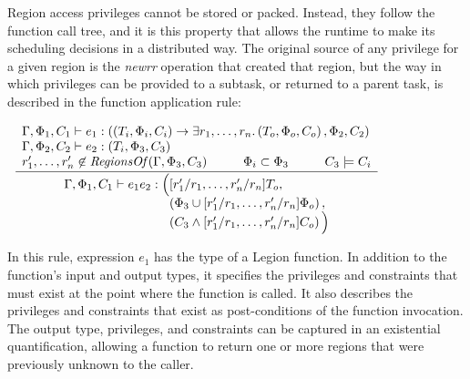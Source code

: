 Region access privileges cannot be stored or packed.  Instead, they follow the
function call tree, and it is this property that allows the runtime to make
its scheduling decisions in a distributed way.  The original source of any
privilege for a given region is the \emph{newrr} operation that created that
region, but the way in which privileges can be provided to a subtask, or
returned to a parent task, is described in the function application rule:

\begin{center}
\begin{math}
\begin{array}{c}
\infrule
{
\begin{array}{lc}
  \Gamma, \Phi_1, C_1 \vdash e_1 : \left(\left(T_i, \Phi_i, C_i\right) \rightarrow \exists r_1, \ldots, r_n . \left(T_o, \Phi_o, C_o\right), \Phi_2, C_2\right) \\
  \Gamma, \Phi_2, C_2 \vdash e_2 : \left(T_i, \Phi_3, C_3\right) \\
  r'_1, \ldots, r'_n \not\in \mathit{RegionsOf}(\Gamma, \Phi_3, C_3) \hspace{1cm} 
  \Phi_i \subset \Phi_3 \hspace{1cm}
  C_3 \models C_i
\end{array}
}
{
\begin{array}{l@{}l}
  \Gamma, \Phi_1, C_1 \vdash e_1 e_2 : \Big( & [r'_1/r_1,\ldots,r'_n/r_n]T_o, \\
 & \left(\Phi_3 \cup [r'_1/r_1,\ldots,r'_n/r_n] \Phi_o\right) , \\
 & \left(C_3 \wedge [r'_1/r_1,\ldots,r'_n/r_n] C_o\right) \Big)
\end{array}
}
\end{array}
\end{math}
\end{center}

In this rule, expression $e_1$ has the type of a Legion function.  In addition
to the function's input and output types, it specifies the privileges and
constraints that must exist at the point where the function is called.  It also
describes the privileges and constraints that exist as post-conditions of the
function invocation.  The output type, privileges, and constraints can be
captured in an existential quantification, allowing a function to return one
or more regions that were previously unknown to the caller.
